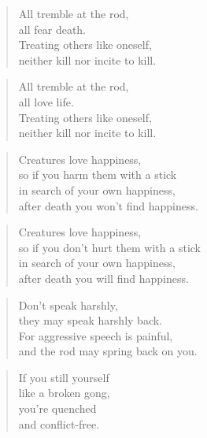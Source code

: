 \documentclass[12pt,openany]{book}%
\begin{document}
\begin{verse}%
All tremble at the rod, \\
all fear death. \\
Treating others like oneself, \\
neither kill nor incite to kill. 

%
\end{verse}

\begin{verse}%
All tremble at the rod, \\
all love life. \\
Treating others like oneself, \\
neither kill nor incite to kill. 

%
\end{verse}

\begin{verse}%
Creatures love happiness, \\
so if you harm them with a stick \\
in search of your own happiness, \\
after death you won’t find happiness. 

%
\end{verse}

\begin{verse}%
Creatures love happiness, \\
so if you don’t hurt them with a stick \\
in search of your own happiness, \\
after death you will find happiness. 

%
\end{verse}

\begin{verse}%
Don’t speak harshly, \\
they may speak harshly back. \\
For aggressive speech is painful, \\
and the rod may spring back on you. 

%
\end{verse}

\begin{verse}%
If you still yourself \\
like a broken gong, \\
you’re quenched \\
and conflict-free. 

%
\end{verse}
\end{document}
